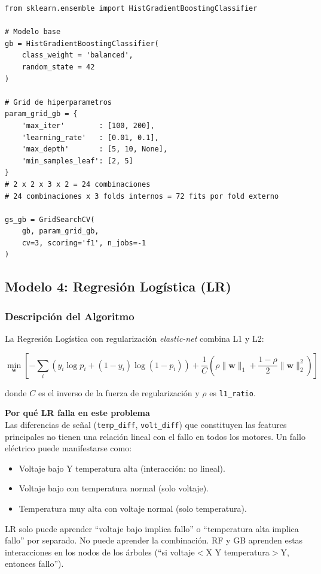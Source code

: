 \documentclass[12pt,a4paper]{article}
\begin{document}
\begin{lstlisting}[caption={Configuraci\'{o}n de Gradient Boosting con GridSearchCV}]
from sklearn.ensemble import HistGradientBoostingClassifier

# Modelo base
gb = HistGradientBoostingClassifier(
    class_weight = 'balanced',
    random_state = 42
)

# Grid de hiperparametros
param_grid_gb = {
    'max_iter'        : [100, 200],
    'learning_rate'   : [0.01, 0.1],
    'max_depth'       : [5, 10, None],
    'min_samples_leaf': [2, 5]
}
# 2 x 2 x 3 x 2 = 24 combinaciones
# 24 combinaciones x 3 folds internos = 72 fits por fold externo

gs_gb = GridSearchCV(
    gb, param_grid_gb,
    cv=3, scoring='f1', n_jobs=-1
)
\end{lstlisting}

\subsection{Modelo 4: Regresi\'{o}n Log\'{i}stica (LR)}

\subsubsection{Descripci\'{o}n del Algoritmo}

La Regresi\'{o}n Log\'{i}stica con regularizaci\'{o}n \textit{elastic-net} combina L1 y L2:

\begin{equation}
  \min_{\mathbf{w}} \left[
    -\sum_{i} \left( y_i \log p_i + (1-y_i)\log(1-p_i) \right)
    + \frac{1}{C} \left( \rho \|\mathbf{w}\|_1 + \frac{1-\rho}{2}\|\mathbf{w}\|_2^2 \right)
  \right]
\end{equation}

donde $C$ es el inverso de la fuerza de regularizaci\'{o}n y $\rho$ es \texttt{l1\_ratio}.

\begin{porquebox}
\textbf{Por qu\'{e} LR falla en este problema}\\[4pt]
Las diferencias de se\~{n}al (\texttt{temp\_diff}, \texttt{volt\_diff}) que constituyen
las features principales no tienen una relaci\'{o}n lineal con el fallo en todos los
motores. Un fallo el\'{e}ctrico puede manifestarse como:
\begin{itemize}[itemsep=2pt]
  \item Voltaje bajo Y temperatura alta (interacci\'{o}n: no lineal).
  \item Voltaje bajo con temperatura normal (solo voltaje).
  \item Temperatura muy alta con voltaje normal (solo temperatura).
\end{itemize}
LR solo puede aprender ``voltaje bajo implica fallo'' o ``temperatura alta implica fallo''
por separado. No puede aprender la combinaci\'{o}n. RF y GB aprenden estas interacciones
en los nodos de los \'{a}rboles (``si voltaje$<$X Y temperatura$>$Y, entonces fallo'').
\end{porquebox}
\end{document}
